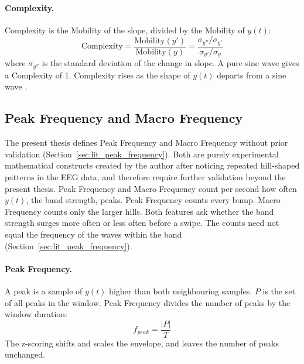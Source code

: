 \documentclass[12pt,a4paper]{report}
\begin{document}
\paragraph{Complexity.} Complexity is the Mobility of the slope, divided by the Mobility of \(y(t)\):
\begin{equation}
    \text{Complexity} = \frac{\text{Mobility}(y')}{\text{Mobility}(y)} = \frac{\sigma_{y''} / \sigma_{y'}}{\sigma_{y'} / \sigma_{y}}
\end{equation}
where \(\sigma_{y''}\) is the standard deviation of the change in slope. A pure sine wave gives a Complexity of 1. Complexity rises as the shape of \(y(t)\) departs from a sine wave \cite{hjorth_eeg_1970}.

\subsection{Peak Frequency and Macro Frequency}
\label{sec:method_peak_frequency}
The present thesis defines Peak Frequency and Macro Frequency without prior validation (Section~\ref{sec:lit_peak_frequency}). Both are purely experimental mathematical constructs created by the author after noticing repeated hill-shaped patterns in the EEG data, and therefore require further validation beyond the present thesis. Peak Frequency and Macro Frequency count per second how often \(y(t)\), the band strength, peaks. Peak Frequency counts every bump. Macro Frequency counts only the larger hills. Both features ask whether the band strength surges more often or less often before a swipe. The counts need not equal the frequency of the waves within the band (Section~\ref{sec:lit_peak_frequency}).

\paragraph{Peak Frequency.} A peak is a sample of \(y(t)\) higher than both neighbouring samples. \(P\) is the set of all peaks in the window. Peak Frequency divides the number of peaks by the window duration:
\begin{equation}
    f_{peak} = \frac{|P|}{T}
\end{equation}
The z-scoring shifts and scales the envelope, and leaves the number of peaks unchanged.
\end{document}
